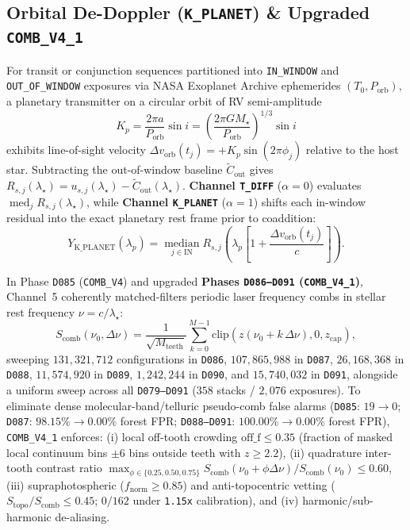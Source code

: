 \documentclass[twocolumn,10pt]{article}
\begin{document}
\subsection{Orbital De-Doppler (\texttt{K\_PLANET}) \& Upgraded \texttt{COMB\_V4\_1}}
For transit or conjunction sequences partitioned into \texttt{IN\_WINDOW} and \texttt{OUT\_OF\_WINDOW} exposures via NASA Exoplanet Archive ephemerides $(T_0, P_{\mathrm{orb}})$, a planetary transmitter on a circular orbit of RV semi-amplitude
\begin{equation}
  K_p = \frac{2\pi a}{P_{\mathrm{orb}}}\sin i = \left(\frac{2\pi G M_{\star}}{P_{\mathrm{orb}}}\right)^{1/3}\sin i
\end{equation}
exhibits line-of-sight velocity $\Delta v_{\mathrm{orb}}(t_j) = +K_p \sin(2\pi\phi_j)$ relative to the host star. Subtracting the out-of-window baseline $\tilde{C}_{\mathrm{out}}$ gives $R_{s,j}(\lambda_{\star}) = u_{s,j}(\lambda_{\star}) - \tilde{C}_{\mathrm{out}}(\lambda_{\star})$. \textbf{Channel \texttt{T\_DIFF}} ($\alpha=0$) evaluates $\operatorname{med}_j R_{s,j}(\lambda_{\star})$, while \textbf{Channel \texttt{K\_PLANET}} ($\alpha=1$) shifts each in-window residual into the exact planetary rest frame prior to coaddition:
\begin{equation}
  Y_{\mathrm{K\_PLANET}}(\lambda_p) = \operatorname*{median}_{j \in \mathrm{IN}} R_{s,j}\!\left(\lambda_p \left[1 + \frac{\Delta v_{\mathrm{orb}}(t_j)}{c}\right]\right).
\end{equation}

In Phase \texttt{D085} (\texttt{COMB\_V4}) and upgraded \textbf{Phases \texttt{D086--D091} (\texttt{COMB\_V4\_1})}, Channel~5 coherently matched-filters periodic laser frequency combs in stellar rest frequency $\nu = c/\lambda_{\star}$:
\begin{equation}
  S_{\mathrm{comb}}(\nu_0, \Delta\nu) = \frac{1}{\sqrt{M_{\mathrm{teeth}}}} \sum_{k=0}^{M-1} \mathrm{clip}\!\left(z(\nu_0 + k\,\Delta\nu), 0, z_{\mathrm{cap}}\right),
\end{equation}
sweeping $131{,}321{,}712$ configurations in \texttt{D086}, $107{,}865{,}988$ in \texttt{D087}, $26{,}168{,}368$ in \texttt{D088}, $11{,}574{,}920$ in \texttt{D089}, $1{,}242{,}244$ in \texttt{D090}, and $15{,}740{,}032$ in \texttt{D091}, alongside a uniform sweep across all \texttt{D079--D091} ($358$ stacks / $2{,}076$ exposures). To eliminate dense molecular-band/telluric pseudo-comb false alarms (\texttt{D085}: $19\rightarrow 0$; \texttt{D087}: $98.15\% \rightarrow 0.00\%$ forest FPR; \texttt{D088--D091}: $100.00\% \rightarrow 0.00\%$ forest FPR), \texttt{COMB\_V4\_1} enforces: (i) local off-tooth crowding $\mathrm{off\_f} \le 0.35$ (fraction of masked local continuum bins $\pm 6$ bins outside teeth with $z \ge 2.2$), (ii) quadrature inter-tooth contrast ratio $\max_{\phi \in \{0.25,0.50,0.75\}} S_{\mathrm{comb}}(\nu_0 + \phi\Delta\nu) / S_{\mathrm{comb}}(\nu_0) \le 0.60$, (iii) supraphotospheric ($f_{\mathrm{norm}} \ge 0.85$) and anti-topocentric vetting ($S_{\mathrm{topo}}/S_{\mathrm{comb}} \le 0.45$; $0/162$ under \texttt{1.15x} calibration), and (iv) harmonic/sub-harmonic de-aliasing.
\end{document}
